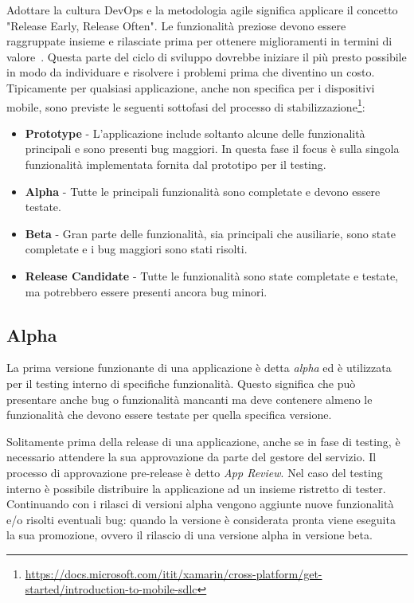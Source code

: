 Adottare la cultura DevOps e la metodologia agile significa applicare il concetto "Release Early, Release Often". Le funzionalità preziose devono essere raggruppate insieme e rilasciate prima per ottenere miglioramenti in termini di valore~\cite{shore2008art}. Questa parte del ciclo di sviluppo dovrebbe iniziare il più presto possibile in modo da individuare e risolvere i problemi prima che diventino un costo. Tipicamente per qualsiasi applicazione, anche non specifica per i dispositivi mobile, sono previste le seguenti sottofasi del processo di stabilizzazione\footnote{\href{https://docs.microsoft.com/itit/xamarin/cross-platform/get-started/introduction-to-mobile-sdlc}{https://docs.microsoft.com/itit/xamarin/cross-platform/get-started/introduction-to-mobile-sdlc}}:
\begin{itemize}
    \item \textbf{Prototype} - L'applicazione include soltanto alcune delle funzionalità principali e sono presenti bug maggiori. In questa fase il focus è sulla singola funzionalità implementata fornita dal prototipo per il testing.
    \item \textbf{Alpha} - Tutte le principali funzionalità sono completate e devono essere testate.
    \item \textbf{Beta} - Gran parte delle funzionalità, sia principali che ausiliarie, sono state completate e i bug maggiori sono stati risolti.
    \item \textbf{Release Candidate} - Tutte le funzionalità sono state completate e testate, ma potrebbero essere presenti ancora bug minori.
\end{itemize}

\subsection{Alpha}
La prima versione funzionante di una applicazione è detta \textit{alpha} ed è utilizzata per il testing interno di specifiche funzionalità. Questo significa che può presentare anche bug o funzionalità mancanti ma deve contenere almeno le funzionalità che devono essere testate per quella specifica versione.

Solitamente prima della release di una applicazione, anche se in fase di testing, è necessario attendere la sua approvazione da parte del gestore del servizio. Il processo di approvazione pre-release è detto \textit{App Review}. Nel caso del testing interno è possibile distribuire la applicazione ad un insieme ristretto di tester. Continuando con i rilasci di versioni alpha vengono aggiunte nuove funzionalità e/o risolti eventuali bug: quando la versione è considerata pronta viene eseguita la sua promozione, ovvero il rilascio di una versione alpha in versione beta.

